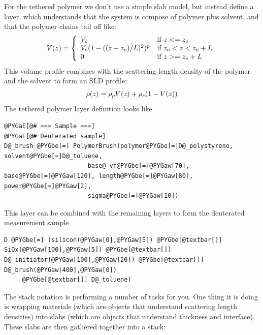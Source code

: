 \documentclass[letterpaper,10pt,english]{sphinxmanual}
\begin{document}
For the tethered polymer we don't use a simple slab model, but instead
define a {\hyperref[api/polymer:refl1d.polymer.PolymerBrush]{}}
layer, which understands that the system is compose of polymer plus
solvent, and that the polymer chains tail off like:
\begin{gather}
\begin{split}V(z) = \left\{
       \begin{array}{ll}
        V_o                        & \mbox{if } z <= z_o \\
        V_o (1 - ((z-z_o)/L)^2)^p  & \mbox{if } z_o < z < z_o + L \\
        0                          & \mbox{if } z >= z_o + L
        \end{array}
       \right.\end{split}\notag
\end{gather}
This volume profile combines with the scattering length density of the
polymer and the solvent to form an SLD profile:
\begin{gather}
\begin{split}\rho(z) = \rho_p V(z) + \rho_s (1 - V(z))\end{split}\notag
\end{gather}
The tethered polymer layer definition looks like

\begin{Verbatim}[commandchars=@\[\]]
@PYGaE[@# === Sample ===]
@PYGaE[@# Deuterated sample]
D@_brush @PYGbe[=] PolymerBrush(polymer@PYGbe[=]D@_polystyrene, solvent@PYGbe[=]D@_toluene,
                       base@_vf@PYGbe[=]@PYGaw[70], base@PYGbe[=]@PYGaw[120], length@PYGbe[=]@PYGaw[80], power@PYGbe[=]@PYGaw[2],
                       sigma@PYGbe[=]@PYGaw[10])
\end{Verbatim}

This layer can be combined with the remaining layers to form the
deuterated measurement sample

\begin{Verbatim}[commandchars=@\[\]]
D @PYGbe[=] (silicon(@PYGaw[0],@PYGaw[5]) @PYGbe[@textbar[]] SiOx(@PYGaw[100],@PYGaw[5]) @PYGbe[@textbar[]] D@_initiator(@PYGaw[100],@PYGaw[20]) @PYGbe[@textbar[]] D@_brush(@PYGaw[400],@PYGaw[0])
     @PYGbe[@textbar[]] D@_toluene)
\end{Verbatim}

The stack notation  is performing
a number of tasks for you.  One thing it is doing is wrapping materials
(which are objects that understand scattering length densities) into
slabs (which are objects that understand thickness and interface).  These
slabs are then gathered together into a stack:
\end{document}
